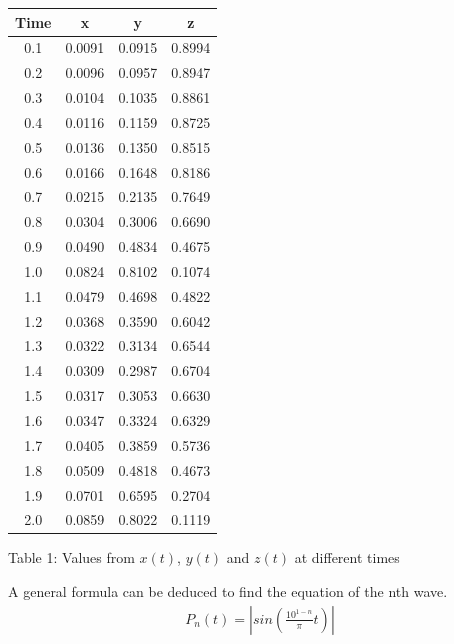 \documentclass[a4paper, 10pt]{article}
\begin{document}
        \begin{center}
            \begin{tabular}{| c | c | c | c |}
                \hline
                \textbf{Time} & \textbf{x} & \textbf{y} & \textbf{z} \\ \hline
                0.1 & 0.0091 & 0.0915 & 0.8994 \\
                0.2 & 0.0096 & 0.0957 & 0.8947 \\
                0.3 & 0.0104 & 0.1035 & 0.8861 \\
                0.4 & 0.0116 & 0.1159 & 0.8725 \\
                0.5 & 0.0136 & 0.1350 & 0.8515 \\
                0.6 & 0.0166 & 0.1648 & 0.8186 \\
                0.7 & 0.0215 & 0.2135 & 0.7649 \\
                0.8 & 0.0304 & 0.3006 & 0.6690 \\
                0.9 & 0.0490 & 0.4834 & 0.4675 \\
                1.0 & 0.0824 & 0.8102 & 0.1074 \\
                1.1 & 0.0479 & 0.4698 & 0.4822 \\
                1.2 & 0.0368 & 0.3590 & 0.6042 \\
                1.3 & 0.0322 & 0.3134 & 0.6544 \\
                1.4 & 0.0309 & 0.2987 & 0.6704 \\
                1.5 & 0.0317 & 0.3053 & 0.6630 \\
                1.6 & 0.0347 & 0.3324 & 0.6329 \\
                1.7 & 0.0405 & 0.3859 & 0.5736 \\
                1.8 & 0.0509 & 0.4818 & 0.4673 \\
                1.9 & 0.0701 & 0.6595 & 0.2704 \\
                2.0 & 0.0859 & 0.8022 & 0.1119 \\ \hline
            \end{tabular}
        \end{center}
        \begin{center}Table 1: Values from $x(t)$, $y(t)$ and $z(t)$ at different times\end{center}
        A general formula can be deduced to find the equation of the nth wave.
        \begin{align}
            P_{n}(t) = \left| sin\left( \frac{10^{1-n}}{\pi}t \right)\right|
        \end{align}
\end{document}
